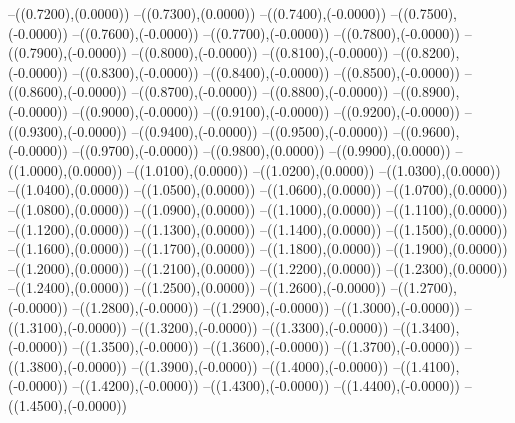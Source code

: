 {	--({\sx*(0.7200)},{\sy*(0.0000)})
	--({\sx*(0.7300)},{\sy*(0.0000)})
	--({\sx*(0.7400)},{\sy*(-0.0000)})
	--({\sx*(0.7500)},{\sy*(-0.0000)})
	--({\sx*(0.7600)},{\sy*(-0.0000)})
	--({\sx*(0.7700)},{\sy*(-0.0000)})
	--({\sx*(0.7800)},{\sy*(-0.0000)})
	--({\sx*(0.7900)},{\sy*(-0.0000)})
	--({\sx*(0.8000)},{\sy*(-0.0000)})
	--({\sx*(0.8100)},{\sy*(-0.0000)})
	--({\sx*(0.8200)},{\sy*(-0.0000)})
	--({\sx*(0.8300)},{\sy*(-0.0000)})
	--({\sx*(0.8400)},{\sy*(-0.0000)})
	--({\sx*(0.8500)},{\sy*(-0.0000)})
	--({\sx*(0.8600)},{\sy*(-0.0000)})
	--({\sx*(0.8700)},{\sy*(-0.0000)})
	--({\sx*(0.8800)},{\sy*(-0.0000)})
	--({\sx*(0.8900)},{\sy*(-0.0000)})
	--({\sx*(0.9000)},{\sy*(-0.0000)})
	--({\sx*(0.9100)},{\sy*(-0.0000)})
	--({\sx*(0.9200)},{\sy*(-0.0000)})
	--({\sx*(0.9300)},{\sy*(-0.0000)})
	--({\sx*(0.9400)},{\sy*(-0.0000)})
	--({\sx*(0.9500)},{\sy*(-0.0000)})
	--({\sx*(0.9600)},{\sy*(-0.0000)})
	--({\sx*(0.9700)},{\sy*(-0.0000)})
	--({\sx*(0.9800)},{\sy*(0.0000)})
	--({\sx*(0.9900)},{\sy*(0.0000)})
	--({\sx*(1.0000)},{\sy*(0.0000)})
	--({\sx*(1.0100)},{\sy*(0.0000)})
	--({\sx*(1.0200)},{\sy*(0.0000)})
	--({\sx*(1.0300)},{\sy*(0.0000)})
	--({\sx*(1.0400)},{\sy*(0.0000)})
	--({\sx*(1.0500)},{\sy*(0.0000)})
	--({\sx*(1.0600)},{\sy*(0.0000)})
	--({\sx*(1.0700)},{\sy*(0.0000)})
	--({\sx*(1.0800)},{\sy*(0.0000)})
	--({\sx*(1.0900)},{\sy*(0.0000)})
	--({\sx*(1.1000)},{\sy*(0.0000)})
	--({\sx*(1.1100)},{\sy*(0.0000)})
	--({\sx*(1.1200)},{\sy*(0.0000)})
	--({\sx*(1.1300)},{\sy*(0.0000)})
	--({\sx*(1.1400)},{\sy*(0.0000)})
	--({\sx*(1.1500)},{\sy*(0.0000)})
	--({\sx*(1.1600)},{\sy*(0.0000)})
	--({\sx*(1.1700)},{\sy*(0.0000)})
	--({\sx*(1.1800)},{\sy*(0.0000)})
	--({\sx*(1.1900)},{\sy*(0.0000)})
	--({\sx*(1.2000)},{\sy*(0.0000)})
	--({\sx*(1.2100)},{\sy*(0.0000)})
	--({\sx*(1.2200)},{\sy*(0.0000)})
	--({\sx*(1.2300)},{\sy*(0.0000)})
	--({\sx*(1.2400)},{\sy*(0.0000)})
	--({\sx*(1.2500)},{\sy*(0.0000)})
	--({\sx*(1.2600)},{\sy*(-0.0000)})
	--({\sx*(1.2700)},{\sy*(-0.0000)})
	--({\sx*(1.2800)},{\sy*(-0.0000)})
	--({\sx*(1.2900)},{\sy*(-0.0000)})
	--({\sx*(1.3000)},{\sy*(-0.0000)})
	--({\sx*(1.3100)},{\sy*(-0.0000)})
	--({\sx*(1.3200)},{\sy*(-0.0000)})
	--({\sx*(1.3300)},{\sy*(-0.0000)})
	--({\sx*(1.3400)},{\sy*(-0.0000)})
	--({\sx*(1.3500)},{\sy*(-0.0000)})
	--({\sx*(1.3600)},{\sy*(-0.0000)})
	--({\sx*(1.3700)},{\sy*(-0.0000)})
	--({\sx*(1.3800)},{\sy*(-0.0000)})
	--({\sx*(1.3900)},{\sy*(-0.0000)})
	--({\sx*(1.4000)},{\sy*(-0.0000)})
	--({\sx*(1.4100)},{\sy*(-0.0000)})
	--({\sx*(1.4200)},{\sy*(-0.0000)})
	--({\sx*(1.4300)},{\sy*(-0.0000)})
	--({\sx*(1.4400)},{\sy*(-0.0000)})
	--({\sx*(1.4500)},{\sy*(-0.0000)})
}
